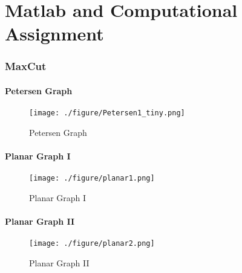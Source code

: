 \documentclass[11pt,a4paper]{article}
\begin{document}
\begin{titlepage}
    \maketitle
\end{titlepage}
\renewcommand{\contentsname}{Table of Contents}
\begin{center} 
    \tableofcontents 
    \listoffigures
\end{center}
\newpage

\part{Matlab and Computational Assignment}
\section{MaxCut}
\subsection{Petersen Graph}
\begin{figure}[h]
    \centering
    \texttt{[image: ./figure/Petersen1\_tiny.png]} \\
    \caption{Petersen Graph}
\end{figure}

\subsection{Planar Graph I}
\begin{figure}[h]
    \centering
    \texttt{[image: ./figure/planar1.png]} \\
    \caption{Planar Graph I}
\end{figure}

\subsection{Planar Graph II}
\begin{figure}[h]
    \centering
    \texttt{[image: ./figure/planar2.png]} \\
    \caption{Planar Graph II}
\end{figure}
\end{document}
